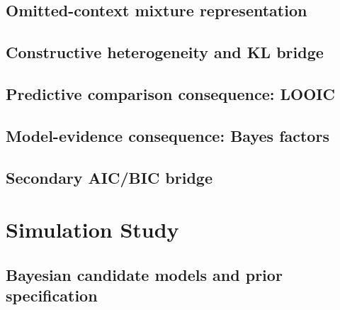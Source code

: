 \documentclass[11pt]{article}
\begin{document}

\subsection{Omitted-context mixture representation}


\subsection{Constructive heterogeneity and KL bridge}


\subsection{Predictive comparison consequence: LOOIC}


\subsection{Model-evidence consequence: Bayes factors}


\subsection{Secondary AIC/BIC bridge}


\section{Simulation Study}

\subsection{Bayesian candidate models and prior specification}

\end{document}
